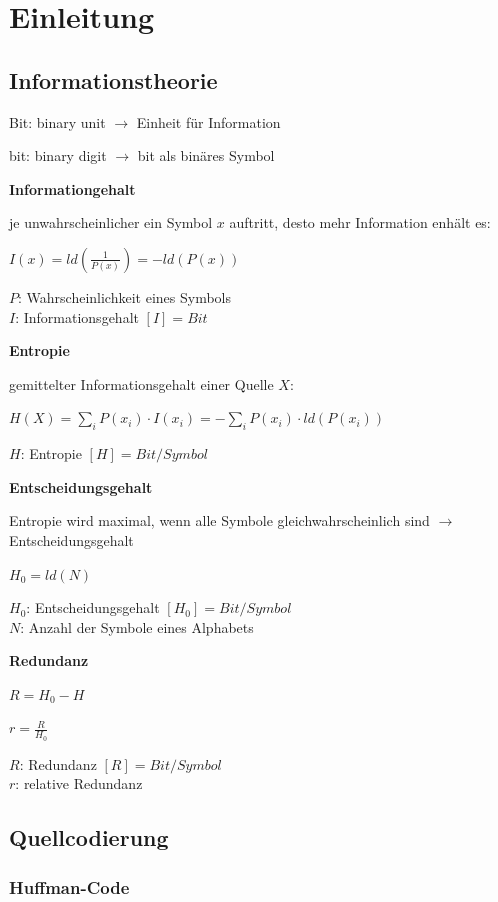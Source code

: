 \section{Einleitung}

\subsection{Informationstheorie}

Bit: binary unit $\rightarrow$ Einheit für Information

bit: binary digit $\rightarrow$ bit als binäres Symbol

\textbf{Informationgehalt} 

je unwahrscheinlicher ein Symbol $x$ auftritt, desto mehr Information enhält es:

$\displaystyle{
    I(x) = ld\left( \frac{1}{P(x)} \right) = -ld(P(x))
}$

$P$: Wahrscheinlichkeit eines Symbols\\
$I$: Informationsgehalt $[I] = Bit$

\textbf{Entropie}

gemittelter Informationsgehalt einer Quelle $X$:

$\displaystyle{
    H(X) = \sum_{i} P(x_i) \cdot I(x_i) = - \sum_{i} P(x_i) \cdot ld(P(x_i))
}$

$H$: Entropie $[H] = Bit/Symbol$

\textbf{Entscheidungsgehalt}

Entropie wird maximal, wenn alle Symbole gleichwahrscheinlich sind
$\rightarrow$ Entscheidungsgehalt

$\displaystyle{
    H_0 = ld(N)
}$

$H_0$: Entscheidungsgehalt $[H_0] = Bit/Symbol$\\
$N$: Anzahl der Symbole eines Alphabets

\textbf{Redundanz}

$\displaystyle{
    R = H_0 - H
}$

$\displaystyle{
    r = \frac{R}{H_0}
}$

$R$: Redundanz $[R] = Bit/Symbol$\\
$r$: relative Redundanz


\subsection{Quellcodierung}

\subsubsection{Huffman-Code}

